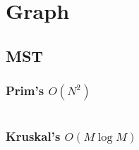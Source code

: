 \section{Graph}

\subsection{MST}
\subsubsection{Prim's $O(N^2)$}
\inputminted{cpp}{../code/graph/mst/prim.cpp}
\subsubsection{Kruskal's $O(M\log M)$}
\inputminted{cpp}{../code/graph/mst/kruskal.cpp}